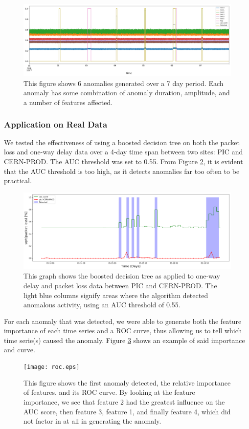 \documentclass[5p]{elsarticle}
\begin{document}
\begin{figure}[htbp]
    \centering
    \includegraphics[width=\linewidth]{withauc.png}
    \caption{This figure shows 6 anomalies generated over a 7 day period. Each anomaly has some combination of anomaly duration, amplitude, and a number of features affected.}
    \label{fig:withauc}
\end{figure}

\subsubsection{Application on Real Data}

We tested the effectiveness of using a boosted decision tree on both the packet loss and one-way delay data over a 4-day time span between two sites: PIC and CERN-PROD. The AUC threshold was set to 0.55. From Figure \ref{fig:BDTlow}, it is evident that the AUC threshold is too high, as it detects anomalies far too often to be practical.
\begin{figure}[htbp]
    \centering
    \includegraphics[width=1.0\linewidth]{BDT_lowcut.png}
    \caption{This graph shows the boosted decision tree as applied to one-way delay and packet loss data between PIC and CERN-PROD. The light blue columns signify areas where the algorithm detected anomalous activity, using an AUC threshold of 0.55.}
    \label{fig:BDTlow}
\end{figure}

For each anomaly that was detected, we were able to generate both the feature importance of each time series and a ROC curve, thus allowing us to tell which time serie(s) caused the anomaly. Figure \ref{fig:roc} shows an example of said importance and curve. 
\begin{figure}[htbp]
    \centering
    \texttt{[image: roc.eps]}
    \caption{This figure shows the first anomaly detected, the relative importance of features, and its ROC curve. By looking at the feature importance, we see that feature 2 had the greatest influence on the AUC score, then feature 3, feature 1, and finally feature 4, which did not factor in at all in generating the anomaly.}
    \label{fig:roc}
\end{figure}
\end{document}
